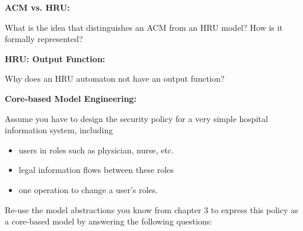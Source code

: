 \documentclass[10pt]{exam}  %
\begin{document}
\begin{questions}
    \question \textbf{ACM vs. HRU:}\hfill

    What is the idea that distinguishes an ACM from an HRU model? How is it formally represented?
    \begin{solution}
    \end{solution}

    \question \textbf{HRU: Output Function:}\hfill

    Why does an HRU automaton not have an output function?
    \begin{solution}
    \end{solution}

    \question \textbf{Core-based Model Engineering:}\hfill

    Assume you have to design the security policy for a very simple hospital information system, including
    \begin{itemize}
        \item users in roles such as physician, nurse, etc.
        \item legal information flows between these roles
        \item one operation to change a user's roles.
    \end{itemize}
    Re-use the model abstractions you know from chapter 3 to express this policy as a core-based model by answering the following questions:
    \begin{solution}
    \end{solution}


\end{questions}
\end{document}
